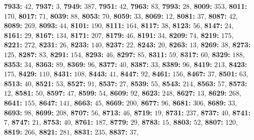 \textsf{\bfseries 7933:} $42$, \textsf{\bfseries 7937:} $3$, \textsf{\bfseries 7949:} $387$, \textsf{\bfseries 7951:} $42$, \textsf{\bfseries 7963:} $83$, \textsf{\bfseries 7993:} $28$, \textsf{\bfseries 8009:} $353$, \textsf{\bfseries 8011:} $170$, \textsf{\bfseries 8017:} $71$, \textsf{\bfseries 8039:} $88$, \textsf{\bfseries 8053:} $70$, \textsf{\bfseries 8059:} $33$, \textsf{\bfseries 8069:} $12$, \textsf{\bfseries 8081:} $37$, \textsf{\bfseries 8087:} $42$, \textsf{\bfseries 8089:} $269$, \textsf{\bfseries 8093:} $44$, \textsf{\bfseries 8101:} $190$, \textsf{\bfseries 8111:} $164$, \textsf{\bfseries 8117:} $38$, \textsf{\bfseries 8123:} $56$, \textsf{\bfseries 8147:} $24$, \textsf{\bfseries 8161:} $29$, \textsf{\bfseries 8167:} $134$, \textsf{\bfseries 8171:} $207$, \textsf{\bfseries 8179:} $46$, \textsf{\bfseries 8191:} $34$, \textsf{\bfseries 8209:} $74$, \textsf{\bfseries 8219:} $175$, \textsf{\bfseries 8221:} $272$, \textsf{\bfseries 8231:} $26$, \textsf{\bfseries 8233:} $140$, \textsf{\bfseries 8237:} $22$, \textsf{\bfseries 8243:} $20$, \textsf{\bfseries 8263:} $13$, \textsf{\bfseries 8269:} $38$, \textsf{\bfseries 8273:} $125$, \textsf{\bfseries 8287:} $83$, \textsf{\bfseries 8291:} $154$, \textsf{\bfseries 8293:} $46$, \textsf{\bfseries 8297:} $85$, \textsf{\bfseries 8311:} $59$, \textsf{\bfseries 8317:} $60$, \textsf{\bfseries 8329:} $188$, \textsf{\bfseries 8353:} $34$, \textsf{\bfseries 8363:} $89$, \textsf{\bfseries 8369:} $96$, \textsf{\bfseries 8377:} $40$, \textsf{\bfseries 8387:} $33$, \textsf{\bfseries 8389:} $96$, \textsf{\bfseries 8419:} $213$, \textsf{\bfseries 8423:} $175$, \textsf{\bfseries 8429:} $110$, \textsf{\bfseries 8431:} $108$, \textsf{\bfseries 8443:} $41$, \textsf{\bfseries 8447:} $92$, \textsf{\bfseries 8461:} $156$, \textsf{\bfseries 8467:} $37$, \textsf{\bfseries 8501:} $63$, \textsf{\bfseries 8513:} $40$, \textsf{\bfseries 8521:} $53$, \textsf{\bfseries 8527:} $91$, \textsf{\bfseries 8537:} $27$, \textsf{\bfseries 8539:} $55$, \textsf{\bfseries 8543:} $214$, \textsf{\bfseries 8563:} $57$, \textsf{\bfseries 8573:} $12$, \textsf{\bfseries 8581:} $50$, \textsf{\bfseries 8597:} $47$, \textsf{\bfseries 8599:} $54$, \textsf{\bfseries 8609:} $92$, \textsf{\bfseries 8623:} $248$, \textsf{\bfseries 8627:} $13$, \textsf{\bfseries 8629:} $268$, \textsf{\bfseries 8641:} $155$, \textsf{\bfseries 8647:} $141$, \textsf{\bfseries 8663:} $45$, \textsf{\bfseries 8669:} $200$, \textsf{\bfseries 8677:} $96$, \textsf{\bfseries 8681:} $306$, \textsf{\bfseries 8689:} $33$, \textsf{\bfseries 8693:} $98$, \textsf{\bfseries 8699:} $208$, \textsf{\bfseries 8707:} $56$, \textsf{\bfseries 8713:} $46$, \textsf{\bfseries 8719:} $19$, \textsf{\bfseries 8731:} $237$, \textsf{\bfseries 8737:} $40$, \textsf{\bfseries 8741:} $7$, \textsf{\bfseries 8747:} $21$, \textsf{\bfseries 8753:} $40$, \textsf{\bfseries 8761:} $187$, \textsf{\bfseries 8779:} $29$, \textsf{\bfseries 8783:} $15$, \textsf{\bfseries 8803:} $52$, \textsf{\bfseries 8807:} $120$, \textsf{\bfseries 8819:} $266$, \textsf{\bfseries 8821:} $281$, \textsf{\bfseries 8831:} $235$, \textsf{\bfseries 8837:} $37$, 
